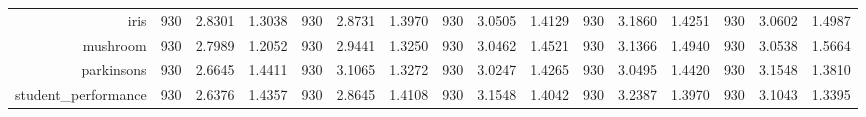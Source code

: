 \begin{table}[htbp]
{\begin{tabular}{rccccccccccccccc}
			iris                                & 930                                     & \cellcolor[rgb]{ .776,  .937,  .808}\textcolor[rgb]{ 0,  .38,  0}{2.8301}          & 1.3038          & 930                             & 2.8731                                                                    & 1.3970          & 930                             & 3.0505          & 1.4129          & 930                             & 3.1860                                                                    & 1.4251          & 930                             & 3.0602                                                                    & 1.4987          \\
			mushroom                            & 930                                     & \cellcolor[rgb]{ .776,  .937,  .808}\textcolor[rgb]{ 0,  .38,  0}{2.7989}          & 1.2052          & 930                             & 2.9441                                                                    & 1.3250          & 930                             & 3.0462          & 1.4521          & 930                             & 3.1366                                                                    & 1.4940          & 930                             & 3.0538                                                                    & 1.5664          \\
			parkinsons                          & 930                                     & \cellcolor[rgb]{ .776,  .937,  .808}\textcolor[rgb]{ 0,  .38,  0}{2.6645}          & 1.4411          & 930                             & 3.1065                                                                    & 1.3272          & 930                             & 3.0247          & 1.4265          & 930                             & 3.0495                                                                    & 1.4420          & 930                             & 3.1548                                                                    & 1.3810          \\
			student\_performance                & 930                                     & \cellcolor[rgb]{ .776,  .937,  .808}\textcolor[rgb]{ 0,  .38,  0}{2.6376}          & 1.4357          & 930                             & 2.8645                                                                    & 1.4108          & 930                             & 3.1548          & 1.4042          & 930                             & 3.2387                                                                    & 1.3970          & 930                             & 3.1043                                                                    & 1.3395          \\

\end{tabular}}
\end{table}
